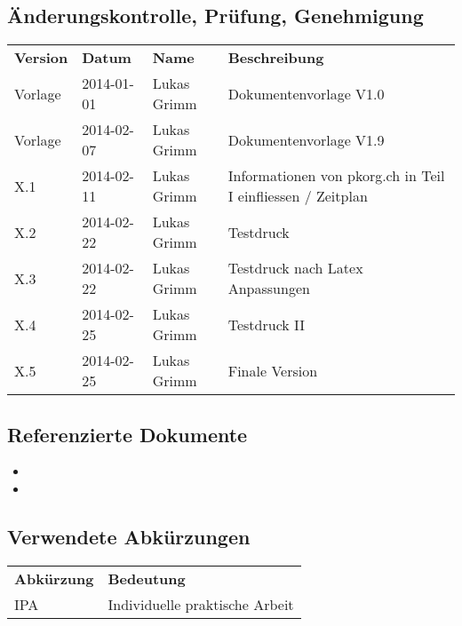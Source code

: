 \subsection{Änderungskontrolle, Prüfung, Genehmigung}
\begin{tabular}{l | l | l | l}
\textbf{Version} & \textbf{Datum} & \textbf{Name} & \textbf{Beschreibung} \\
Vorlage & 2014-01-01 & Lukas Grimm & Dokumentenvorlage V1.0 \\
Vorlage & 2014-02-07 & Lukas Grimm & Dokumentenvorlage V1.9 \\
X.1 & 2014-02-11 & Lukas Grimm & Informationen von pkorg.ch in Teil I einfliessen / Zeitplan \\
X.2 & 2014-02-22 & Lukas Grimm & Testdruck \\
X.3 & 2014-02-22 & Lukas Grimm & Testdruck nach Latex Anpassungen \\
X.4 & 2014-02-25 & Lukas Grimm & Testdruck II \\
X.5 & 2014-02-25 & Lukas Grimm & Finale Version \\
\end{tabular}

\subsection{Referenzierte Dokumente}
\begin{itemize}
\item
\item 
\end{itemize}




\subsection{Verwendete Abkürzungen}
\begin{tabular}{l | l}
\textbf{Abkürzung} & \textbf{Bedeutung} \\
IPA & Individuelle praktische Arbeit \\
\end{tabular}